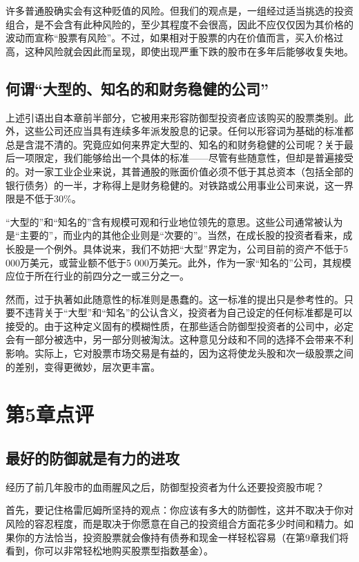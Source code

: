 \documentclass[12pt,oneside]{book}
\begin{document}
许多普通股确实会有这种贬值的风险。但我们的观点是，一组经过适当挑选的投资组合，是不会含有此种风险的，至少其程度不会很高，因此不应仅仅因为其价格的波动而宣称“股票有风险”。不过，如果相对于股票的内在价值而言，买入价格过高，这种风险就会因此而呈现，即使出现严重下跌的股市在多年后能够收复失地。

\subsection{何谓“大型的、知名的和财务稳健的公司”}
上述引语出自本章前半部分，它被用来形容防御型投资者应该购买的股票类别。此外，这些公司还应当具有连续多年派发股息的记录。任何以形容词为基础的标准都总是含混不清的。究竟应如何来界定大型的、知名的和财务稳健的公司呢？关于最后一项限定，我们能够给出一个具体的标准——尽管有些随意性，但却是普遍接受的。对一家工业企业来说，其普通股的账面价值必须不低于其总资本（包括全部的银行债务）的一半，才称得上是财务稳健的。对铁路或公用事业公司来说，这一界限是不低于30\%。

“大型的”和“知名的”含有规模可观和行业地位领先的意思。这些公司通常被认为是“主要的”，而业内的其他企业则是“次要的”。当然，在成长股的投资者看来，成长股是一个例外。具体说来，我们不妨把“大型”界定为，公司目前的资产不低于5 000万美元，或营业额不低于5 000万美元。此外，作为一家“知名的”公司，其规模应位于所在行业的前四分之一或三分之一。

然而，过于执著如此随意性的标准则是愚蠢的。这一标准的提出只是参考性的。只要不违背关于“大型”和“知名”的公认含义，投资者为自己设定的任何标准都是可以接受的。由于这种定义固有的模糊性质，在那些适合防御型投资者的公司中，必定会有一部分被选中，另一部分则被淘汰。这种意见分歧和不同的选择不会带来不利影响。实际上，它对股票市场交易是有益的，因为这将使龙头股和次一级股票之间的差别，变得更微妙，层次更丰富。


\section{第5章点评}
\subsection{最好的防御就是有力的进攻}
经历了前几年股市的血雨腥风之后，防御型投资者为什么还要投资股市呢？

首先，要记住格雷厄姆所坚持的观点：你应该有多大的防御性，这并不取决于你对风险的容忍程度，而是取决于你愿意在自己的投资组合方面花多少时间和精力。如果你的方法恰当，投资股票就会像持有债券和现金一样轻松容易（在第9章我们将看到，你可以非常轻松地购买股票型指数基金）。
\end{document}
